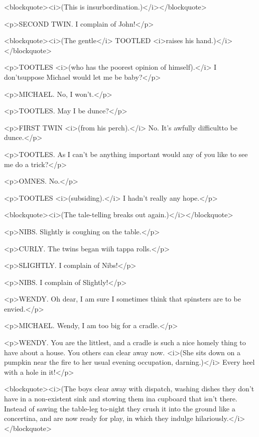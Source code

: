 <blockquote><i>(This is insurbordination.)</i></blockquote>

<p>SECOND TWIN. I complain of John!</p>

<blockquote><i>(The gentle</i> TOOTLED <i>raises his
hand.)</i></blockquote>

<p>TOOTLES <i>(who has the poorest opinion of himself).</i> I
don'tsuppose Michael would let me be baby?</p>

<p>MICHAEL. No, I won't.</p>

<p>TOOTLES. May I be dunce?</p>

<p>FIRST TWIN <i>(from his perch).</i> No. It's awfully difficultto
be dunce.</p>

<p>TOOTLES. As I can't be anything important would any of you like to
see me do a trick?</p>

<p>OMNES. No.</p>

<p>TOOTLES <i>(subsiding).</i> I hadn't really any hope.</p>

<blockquote><i>(The tale-telling breaks out again.)</i></blockquote>

<p>NIBS. Slightly is coughing on the table.</p>

<p>CURLY. The twins began wiih tappa rolls.</p>

<p>SLIGHTLY. I complain of Nibs!</p>

<p>NIBS. I complain of Slightly!</p>

<p>WENDY. Oh dear, I am sure I sometimes think that spinsters are to
be envied.</p>

<p>MICHAEL. Wendy, I am too big for a cradle.</p>

<p>WENDY. You are the littlest, and a cradle is such a nice homely
thing to have about a house. You others can clear away now. <i>(She
sits down on a pumpkin near the fire to her usual evening occupation,
darning.)</i> Every heel with a hole in it!</p>

<blockquote><i>(The boys clear away with dispatch, washing dishes
they don't have in a non-existent sink and stowing them ina cupboard
that isn't there. Instead of sawing the table-leg to-night they crush
it into the ground like a concertina, and are now ready for play, in
which they indulge hilariously.</i></blockquote>

